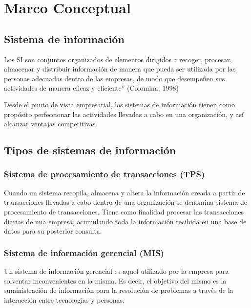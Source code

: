 \chapter{Marco Conceptual}

\section{Sistema de información} 	
\setlength{\parskip}{5mm}
Los SI son conjuntos organizados de elementos dirigidos a recoger, procesar, almacenar y distribuir información de manera que pueda ser utilizada por las personas adecuadas dentro de las empresas, de modo que desempeñen sus actividades de manera eficaz y eficiente” (Colomina, 1998)

Desde el punto de vista empresarial, los sistemas de información tienen como propósito perfeccionar las actividades llevadas a cabo en una organización, y así alcanzar ventajas competitivas.

\setlength{\parskip}{0mm}


\section{Tipos de sistemas de información} 	
\setlength{\parskip}{5mm}

\setlength{\parskip}{0mm}

\subsection{Sistema de procesamiento de transacciones (TPS)}
\setlength{\parskip}{5mm}
Cuando un sistema recopila, almacena y altera la información creada a partir de transacciones llevadas a cabo dentro de una organización se denomina sistema de procesamiento de transacciones. Tiene como finalidad procesar las transacciones diarias de una empresa, acumulando toda la información recibida en una base de datos para su posterior consulta.

\setlength{\parskip}{0mm}

\subsection{Sistema de información gerencial (MIS)}
\setlength{\parskip}{5mm}
Un sistema de información gerencial es aquel utilizado por la empresa para solventar inconvenientes en la misma. Es decir, el objetivo del mismo es la suministración de información para la resolución de problemas a través de la interacción entre tecnologías y personas.

